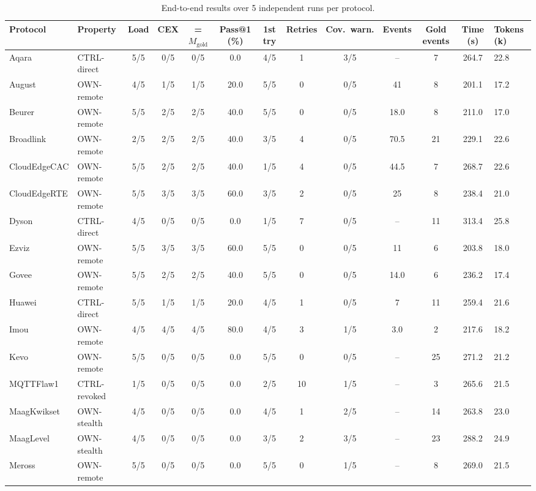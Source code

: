 \begin{table}[t]
\centering
\scriptsize
\caption{End-to-end results over 5 independent runs per protocol.}
\label{tab:pilot_eval_matrix}
\begin{tabular*}{\linewidth}{@{\extracolsep{\fill}} ll ccccc ccc cc @{}}
\hline\hline
\textbf{Protocol} & \textbf{Property} & \textbf{Load} & \textbf{CEX} & \textbf{= $M_{\mathrm{gold}}$} & \textbf{Pass@1 (\%)} & \textbf{1st try} & \textbf{Retries} & \textbf{Cov.\ warn.} & \textbf{Events} & \textbf{Gold events} & \textbf{Time (s)} & \textbf{Tokens (k)} \\
\hline
Aqara & CTRL-direct & 5/5 & 0/5 & 0/5 & 0.0 & 4/5 & 1 & 3/5 & -- & 7 & 264.7 & 22.8 \\
August & OWN-remote & 4/5 & 1/5 & 1/5 & 20.0 & 5/5 & 0 & 0/5 & 41 & 8 & 201.1 & 17.2 \\
Beurer & OWN-remote & 5/5 & 2/5 & 2/5 & 40.0 & 5/5 & 0 & 0/5 & 18.0 & 8 & 211.0 & 17.0 \\
Broadlink & OWN-remote & 2/5 & 2/5 & 2/5 & 40.0 & 3/5 & 4 & 0/5 & 70.5 & 21 & 229.1 & 22.6 \\
CloudEdgeCAC & OWN-remote & 5/5 & 2/5 & 2/5 & 40.0 & 1/5 & 4 & 0/5 & 44.5 & 7 & 268.7 & 22.6 \\
CloudEdgeRTE & OWN-remote & 5/5 & 3/5 & 3/5 & 60.0 & 3/5 & 2 & 0/5 & 25 & 8 & 238.4 & 21.0 \\
Dyson & CTRL-direct & 4/5 & 0/5 & 0/5 & 0.0 & 1/5 & 7 & 0/5 & -- & 11 & 313.4 & 25.8 \\
Ezviz & OWN-remote & 5/5 & 3/5 & 3/5 & 60.0 & 5/5 & 0 & 0/5 & 11 & 6 & 203.8 & 18.0 \\
Govee & OWN-remote & 5/5 & 2/5 & 2/5 & 40.0 & 5/5 & 0 & 0/5 & 14.0 & 6 & 236.2 & 17.4 \\
Huawei & CTRL-direct & 5/5 & 1/5 & 1/5 & 20.0 & 4/5 & 1 & 0/5 & 7 & 11 & 259.4 & 21.6 \\
Imou & OWN-remote & 4/5 & 4/5 & 4/5 & 80.0 & 4/5 & 3 & 1/5 & 3.0 & 2 & 217.6 & 18.2 \\
Kevo & OWN-remote & 5/5 & 0/5 & 0/5 & 0.0 & 5/5 & 0 & 0/5 & -- & 25 & 271.2 & 21.2 \\
MQTTFlaw1 & CTRL-revoked & 1/5 & 0/5 & 0/5 & 0.0 & 2/5 & 10 & 1/5 & -- & 3 & 265.6 & 21.5 \\
MaagKwikset & OWN-stealth & 4/5 & 0/5 & 0/5 & 0.0 & 4/5 & 1 & 2/5 & -- & 14 & 263.8 & 23.0 \\
MaagLevel & OWN-stealth & 4/5 & 0/5 & 0/5 & 0.0 & 3/5 & 2 & 3/5 & -- & 23 & 288.2 & 24.9 \\
Meross & OWN-remote & 5/5 & 0/5 & 0/5 & 0.0 & 5/5 & 0 & 1/5 & -- & 8 & 269.0 & 21.5 \\

\end{tabular*}
\end{table}
